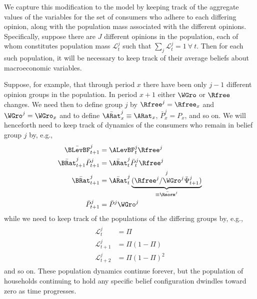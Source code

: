 \documentclass{handout}
\begin{document}
We capture this modification to the model by keeping track of the
aggregate values of the variables for the set of consumers who adhere
to each differing opinion, along with the population mass associated
with the different opinions.  Specifically, suppose there are $J$
different opinions in the population, each of whom constitutes
population mass $\mathcal{L}^{j}_{t}$ such that $\sum_{j}
\mathcal{L}^{j}_{t} = 1~\forall~t$.  Then for each such population, it will be
necessary to keep track of their average beliefs about macroeconomic
variables.  

Suppose, for example, that through period $x$ there have been only $j-1$ different 
opinion groups in the population.  In period $x+1$ either $\WGro$ or $\Rfree$ changes.  
We need then to define group $j$ by $\Rfree^{j}=\Rfree_{x}$ and $\WGro^{j}=\WGro_{x}$ and
to define $\bar{\ARat}^{j}_{x} \equiv \ARat_{x}$, $\bar{P}^{j}_{x}=P_{x}$, and so on.
We will henceforth need to keep track of dynamics of the consumers who remain in belief group
$j$ by, e.g.,
\begin{equation}\begin{gathered}\begin{aligned}
  \bar{\BLevBF}^{j}_{t+1} & =  \ALevBF^{j}_{t} \Rfree^{j}
\\ \bar{\BRat}^{j}_{t+1}\bar{P}^{j}_{t+1} & =  \bar{\ARat}^{j}_{t}\bar{P}^{j}_{t} \Rfree^{j}
\\ \bar{\BRat}^{j}_{t+1} & =  \bar{\ARat}^{j}_{t} \underbrace{(\Rfree^{j}/\WGro^{j} \bar{\Psi}^{j}_{t+1})}^{j}_{\equiv \bar{\Rnorm}^{j}} 
\\ \bar{P}^{j}_{t+1} & =  \bar{P}^{j} \WGro^{j}
\end{aligned}\end{gathered}\end{equation}
while we need to keep track of the populations of the differing groups by, e.g., 
\begin{equation}\begin{gathered}\begin{aligned}
    \mathcal{L}^{j}_{t} & =  \Pi
\\  \mathcal{L}^{j}_{t+1} & =  \Pi(1-\Pi)
\\  \mathcal{L}^{j}_{t+2} & =  \Pi(1-\Pi)^{2}
\end{aligned}\end{gathered}\end{equation}
and so on.  These population dynamics continue forever, but the population of households continuing
to hold any specific belief configuration dwindles toward zero as time progresses.  
\end{document}
